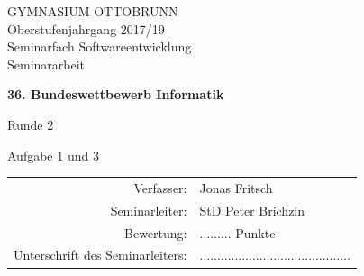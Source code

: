 \documentclass[a4paper,12pt]{article}			%
\begin{document}
\parindent0cm 							%


\thispagestyle{empty}

\begin{center} 							%

\begin{large} 
GYMNASIUM OTTOBRUNN	\\
\vspace{1cm}
Oberstufenjahrgang 2017/19\\
\vspace{1cm}
Seminarfach Softwareentwicklung\\
\vspace{2cm}
Seminararbeit\\
\end{large}


\vspace{1cm}


{\Huge\bfseries 
36. Bundeswettbewerb Informatik\par
Runde 2\par
Aufgabe 1 und 3\par 
}


\vspace{2cm}


\begin{large}							%
\begin{tabular}{rl}						%
Verfasser:& Jonas Fritsch \\			%
Seminarleiter: & StD Peter Brichzin \\
Bewertung:  & ......... Punkte  \\
Unterschrift des Seminarleiters: & ...........................................  \\
\end{tabular} 
\end{large}

\end{center}							%
\end{document}
